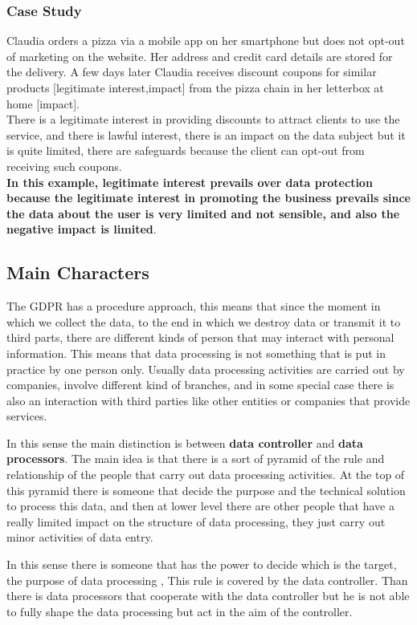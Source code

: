 \subsubsection{Case Study}
Claudia orders a pizza via a mobile app on her smartphone but does not opt-out of marketing on the website. Her address and credit card details are stored for the delivery. A few days later Claudia receives discount coupons for similar products [legitimate interest,impact] from the pizza chain in her letterbox at home [impact].\\
There is a legitimate interest in providing discounts to attract clients to use the service, and there is lawful interest, there is an impact on the data subject but it is quite limited, there are safeguards because the client can opt-out from receiving such coupons.\\
\textbf{In this example, legitimate interest prevails over data protection because the legitimate interest in promoting the business prevails since the data about the user is very limited and not sensible, and also the negative impact is limited}.

\subsection{Main Characters}
The GDPR has a procedure approach, this means that since the moment in which we collect the data, to the end in which we destroy data or transmit it to third parts, there are different kinds of person that may interact with personal information. This means that data processing is not something that is put in practice by one person only. Usually data processing activities are carried out by companies, involve different kind of branches, and in some special case there is also an interaction with third parties like other entities or companies that provide services.

In this sense the main distinction is between \textbf{data controller} and \textbf{data processors}. The main idea is that there is a sort of pyramid of the rule and relationship of the people that carry out data processing activities. At the top of this pyramid there is someone that decide the purpose and the technical solution to process this data, and then at lower level there are other people that have a really limited impact on the structure of data processing, they just carry out minor activities of data entry.

In this sense there is someone that has the power to decide which is the target, the purpose of data processing , This rule is covered by the data controller. Than there is data processors that cooperate with the data controller but he is not able to fully shape the data processing but act in the aim of the controller.
